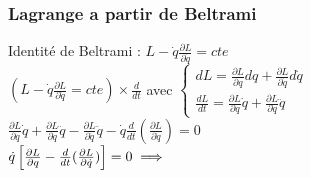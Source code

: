 \documentclass[12pt,oneside]{book}
\begin{document}
\subsubsection{Lagrange a partir de Beltrami}
Identité de Beltrami : $ L - \dot{q} \frac{\partial L}{\partial \dot{q}} = cte  $ \\
$ \left(L - \dot{q} \frac{\partial L}{\partial \dot{q}} = cte \right)\times \frac{d}{dt} $ avec $ \begin{cases} dL = \frac{\partial L}{\partial q}dq + \frac{\partial L}{\partial \dot{q}}d\dot{q}\\ \frac{dL}{dt}=\frac{\partial L}{\partial q}\dot{q} + \frac{\partial L}{\partial \dot{q}}\ddot{q}                \end{cases} $\\
$ \frac{\partial L}{\partial q}\dot{q} + \frac{\partial L}{\partial \dot{q}}\ddot{q} - \frac{\partial L}{\partial \dot{q}}\ddot{q} - \dot{q}\frac{d}{dt}(\frac{\partial L}{\partial \dot{q}}) = 0 $\\
$ \dot{q}\left[ \frac{\partial L}{\partial q} - \frac{d}{dt}(\frac{\partial L}{\partial \dot{q}}) \right] = 0 \\
	\implies$ 
\end{document}
